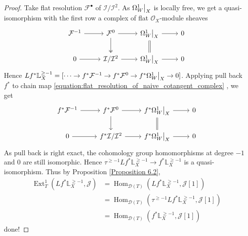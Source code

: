\documentclass{ctexart}
\renewcommand{\hom}{\operatorname{Hom}}
\newcommand{\ext}{\operatorname{Ext}}
\begin{document}
\begin{proof}
    Take flat resolution $\mathcal{F}^{\bullet}$ of $\mathcal{I}/\mathcal{I}^{2}$.
    As $\Omega_{W}^{1}\big{|}_{X}$ is locally free, we get a quasi-isomorphism with the first row a complex of flat $\mathcal{O}_{X}$-module sheaves
    \begin{equation}
        \begin{tikzcd}
            \mathcal{F}^{-1} \arrow[r] &
            \mathcal{F}^{0} \arrow[r] \arrow[d, twoheadrightarrow] &
            \Omega_{W}^{1}\big{|}_{X} \arrow[r] \arrow[d, equal] &
            0 \\
            0 \arrow[r] &
            \mathcal{I}/\mathcal{I}^{2} \arrow[r] &
            \Omega_{W}^{1}\big{|}_{X} \arrow[r] &
            0
        \end{tikzcd}
        \label{equation:flat_resolution_of_naive_cotangent_complex}
    \end{equation}
    Hence $Lf^{\ast}\mathbb{L}_{X}^{\ge -1} = [\cdots \rightarrow f^{\ast}\mathcal{F}^{-1} \rightarrow f^{\ast}\mathcal{F}^{0} \rightarrow f^{\ast}\Omega_{W}^{1}\big{|}_{X} \rightarrow 0]$.
    Applying pull back $f^{\ast}$ to chain map \ref{equation:flat_resolution_of_naive_cotangent_complex} , we get
    \begin{equation}
        \begin{tikzcd}
            f^{\ast}\mathcal{F}^{-1} \arrow[r] &
            f^{\ast}\mathcal{F}^{0} \arrow[r] \arrow[d] &
            f^{\ast}\Omega_{W}^{1}\big{|}_{X} \arrow[r] \arrow[d, equal] &
            0 \\
            0 \arrow[r] &
            f^{\ast}\mathcal{I}/\mathcal{I}^{2} \arrow[r] &
            f^{\ast}\Omega_{W}^{1}\big{|}_{X} \arrow[r] &
            0
        \end{tikzcd}
    \end{equation}
    As pull back is right exact, the cohomology group homomorphisms at degree $-1$ and $0$ are still isomorphic.
    Hence $\tau^{\ge -1}Lf^{\ast}\mathbb{L}_{X}^{\ge -1} \rightarrow f^{\ast}\mathbb{L}_{X}^{\ge -1}$ is a quasi-isomorphism.
    Thus by Proposition \ref{Proposition 6.2}, 
    \begin{equation}
        \begin{split}
            \ext_{T}^{1}(Lf^{\ast}\mathbb{L}_{X}^{\ge -1}, \mathcal{J}) & = \hom_{\mathcal{D}(T)}(Lf^{\ast}\mathbb{L}_{X}^{\ge -1}, \mathcal{J}[1]) \\
            & = \hom_{\mathcal{D}(T)}(\tau^{\ge -1}Lf^{\ast}\mathbb{L}_{X}^{\ge -1}, \mathcal{J}[1]) \\
            & = \hom_{\mathcal{D}(T)}(f^{\ast}\mathbb{L}_{X}^{\ge -1}, \mathcal{J}[1])
        \end{split}
    \end{equation}
    done!
\end{proof}
\end{document}
